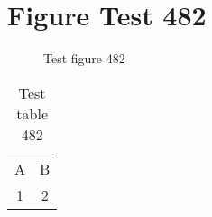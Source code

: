 \documentclass{article}
\begin{document}
\section{Figure Test 482}
\begin{figure}[h]
\caption{Test figure 482}
\end{figure}
\begin{table}[h]
\caption{Test table 482}
\begin{tabular}{cc}
A & B \\
1 & 2
\end{tabular}
\end{table}
\end{document}
